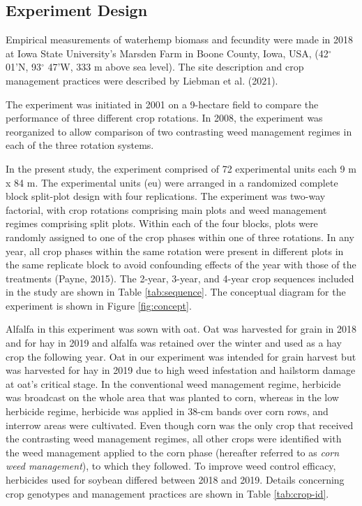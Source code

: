 \documentclass[
]{article}
\author{}
\date{\vspace{-2.5em}}
\begin{document}
\hypertarget{experiment-design}{%
\subsection*{Experiment Design}\label{experiment-design}}

Empirical measurements of waterhemp biomass and fecundity were made in 2018 at Iowa State University's Marsden Farm in Boone County, Iowa, USA, (42\(^\circ\) 01'N, 93\(^\circ\) 47'W, 333 m above sea level). The site description and crop management practices were described by Liebman et al. (2021).

The experiment was initiated in 2001 on a 9-hectare field to compare the performance of three different crop rotations. In 2008, the experiment was reorganized to allow comparison of two contrasting weed management regimes in each of the three rotation systems.

In the present study, the experiment comprised of 72 experimental units each 9 m x 84 m. The experimental units (eu) were arranged in a randomized complete block split-plot design with four replications. The experiment was two-way factorial, with crop rotations comprising main plots and weed management regimes comprising split plots. Within each of the four blocks, plots were randomly assigned to one of the crop phases within one of three rotations. In any year, all crop phases within the same rotation were present in different plots in the same replicate block to avoid confounding effects of the year with those of the treatments (Payne, 2015). The 2-year, 3-year, and 4-year crop sequences included in the study are shown in Table \ref{tab:sequence}. The conceptual diagram for the experiment is shown in Figure \ref{fig:concept}.

Alfalfa in this experiment was sown with oat. Oat was harvested for grain in 2018 and for hay in 2019 and alfalfa was retained over the winter and used as a hay crop the following year. Oat in our experiment was intended for grain harvest but was harvested for hay in 2019 due to high weed infestation and hailstorm damage at oat's critical stage. In the conventional weed management regime, herbicide was broadcast on the whole area that was planted to corn, whereas in the low herbicide regime, herbicide was applied in 38-cm bands over corn rows, and interrow areas were cultivated. Even though corn was the only crop that received the contrasting weed management regimes, all other crops were identified with the weed management applied to the corn phase (hereafter referred to as \emph{corn weed management}), to which they followed. To improve weed control efficacy, herbicides used for soybean differed between 2018 and 2019. Details concerning crop genotypes and management practices are shown in Table \ref{tab:crop-id}.
\end{document}
